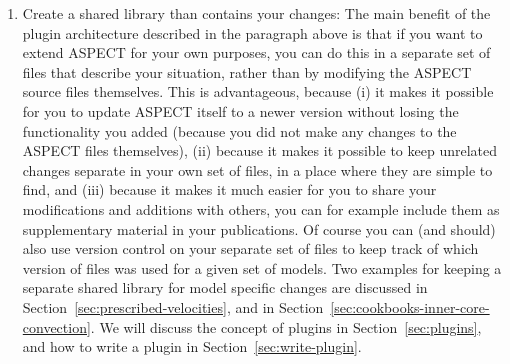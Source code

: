 \documentclass{article}
\newcommand{\aspect}{\textsc{ASPECT}}
\begin{document}
\begin{enumerate}
\item Create a shared library than contains your changes: The main benefit of
the plugin architecture described in the paragraph above is that if you want to
extend \aspect{} for your own purposes, you can do this in a separate set of
files that describe your situation, rather than by modifying the \aspect{}
source files themselves. This is advantageous, because (i) it makes it possible
for you to update \aspect{} itself to a newer version without losing the
functionality you added (because you did not make any changes to the \aspect{}
files themselves), (ii) because it makes it possible to keep unrelated changes
separate in your own set of files, in a place where they are simple to find,
and (iii) because it makes it much easier for you to share your modifications
and additions with others, you can for example include them as supplementary
material in your publications. Of course you can (and should) also use version
control on your separate set of files to keep track of which version of files
was used for a given set of models. Two examples for keeping a separate shared
library for model specific changes are discussed in
Section~\ref{sec:prescribed-velocities}, and in
Section~\ref{sec:cookbooks-inner-core-convection}. We will discuss the concept
of plugins in Section~\ref{sec:plugins}, and how to write a plugin in
Section~\ref{sec:write-plugin}.
\end{enumerate}
\end{document}
